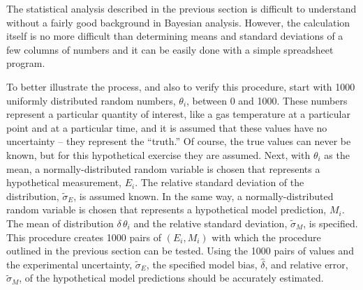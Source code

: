 The statistical analysis described in the previous section is difficult to understand without a fairly good background in Bayesian analysis. However,
the calculation itself is no more difficult than determining means and standard deviations of a few columns of numbers and it can be easily done with
a simple spreadsheet program.

To better illustrate the process, and also to verify this procedure, start with 1000 uniformly distributed
random numbers, $\theta_i$, between 0 and 1000. These numbers represent a particular quantity of interest, like a gas temperature at a particular
point and at a particular time, and it is assumed that these values
have no uncertainty -- they represent the ``truth.'' Of course, the true values can never be known, but for this hypothetical exercise they are assumed.
Next, with $\theta_i$ as the mean, a normally-distributed random variable is chosen that represents a hypothetical measurement, $E_i$.
The relative standard deviation of the distribution, $\widetilde{\sigma}_E$, is assumed known. In the same way, a normally-distributed
random variable is chosen that represents a hypothetical
model prediction, $M_i$. The mean of distribution $\delta \, \theta_i$ and the relative standard deviation, $\widetilde{\sigma}_M$,
is specified.
This procedure creates 1000 pairs of $(E_i,M_i)$ with which the procedure outlined in the previous section can be tested.
Using the 1000 pairs of values and the experimental uncertainty, $\widetilde{\sigma}_E$, the specified model bias, $\hat{\delta}$,
and relative error, $\widetilde{\sigma}_M$, of the hypothetical model predictions should be accurately estimated.

